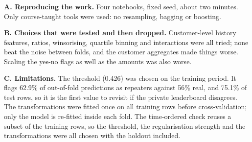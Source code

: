 \documentclass[11pt,a4paper]{article}
\newcommand{\anx}[1]{\textbf{#1.}\space}
\begin{document}
\anx{A. Reproducing the work} Four notebooks, fixed seed, about two minutes. Only course-taught tools were
used: no resampling, bagging or boosting.

\anx{B. Choices that were tested and then dropped} Customer-level history features, ratios, winsorising, quartile
binning and interactions were all tried; none beat the noise between folds, and the customer aggregates made
things worse. Scaling the yes-no flags as well as the amounts was also worse.

\anx{C. Limitations} The threshold (0.426) was chosen on the training period. It flags 62.9\% of out-of-fold
predictions as repeaters against 56\% real, and 75.1\% of test rows, so it is the first value to revisit if the
private leaderboard disagrees. The transformations were fitted once on all
training rows before cross-validation; only the model is re-fitted inside each fold. The time-ordered check
reuses a subset of the training rows, so the threshold, the regularisation strength and the transformations
were all chosen with the holdout included.
\end{document}
